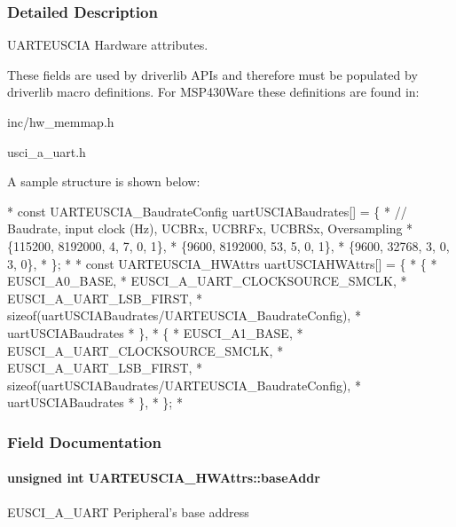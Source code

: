 \subsubsection{Detailed Description}
U\-A\-R\-T\-E\-U\-S\-C\-I\-A Hardware attributes. 

These fields are used by driverlib A\-P\-Is and therefore must be populated by driverlib macro definitions. For M\-S\-P430\-Ware these definitions are found in\-:
\begin{DoxyItemize}
\item inc/hw\-\_\-memmap.\-h
\item usci\-\_\-a\-\_\-uart.\-h
\end{DoxyItemize}

A sample structure is shown below\-: 
\begin{DoxyCode}
*  \textcolor{keyword}{const} UARTEUSCIA_BaudrateConfig uartUSCIABaudrates[] = \{
*   \textcolor{comment}{// Baudrate, input clock (Hz), UCBRx, UCBRFx, UCBRSx, Oversampling}
*      \{115200,  8192000,          4,     7,      0,      1\},
*      \{9600,    8192000,          53,    5,      0,      1\},
*      \{9600,    32768,            3,     0,      3,      0\},
*  \};
*
*  \textcolor{keyword}{const} UARTEUSCIA_HWAttrs uartUSCIAHWAttrs[] = \{
*      \{
*          EUSCI\_A0\_BASE,
*          EUSCI\_A\_UART\_CLOCKSOURCE\_SMCLK,
*          EUSCI\_A\_UART\_LSB\_FIRST,
*          \textcolor{keyword}{sizeof}(uartUSCIABaudrates/UARTEUSCIA_BaudrateConfig),
*          uartUSCIABaudrates
*      \},
*      \{
*          EUSCI\_A1\_BASE,
*          EUSCI\_A\_UART\_CLOCKSOURCE\_SMCLK,
*          EUSCI\_A\_UART\_LSB\_FIRST,
*          \textcolor{keyword}{sizeof}(uartUSCIABaudrates/UARTEUSCIA_BaudrateConfig),
*          uartUSCIABaudrates
*      \},
*  \};
*  
\end{DoxyCode}
 

\subsubsection{Field Documentation}
\paragraph[{base\-Addr}]{\setlength{\rightskip}{0pt plus 5cm}unsigned int U\-A\-R\-T\-E\-U\-S\-C\-I\-A\-\_\-\-H\-W\-Attrs\-::base\-Addr}\label{struct_u_a_r_t_e_u_s_c_i_a___h_w_attrs_afa40bb7e1a85f9e20565a690ed9b86cc}
E\-U\-S\-C\-I\-\_\-\-A\-\_\-\-U\-A\-R\-T Peripheral's base address 
